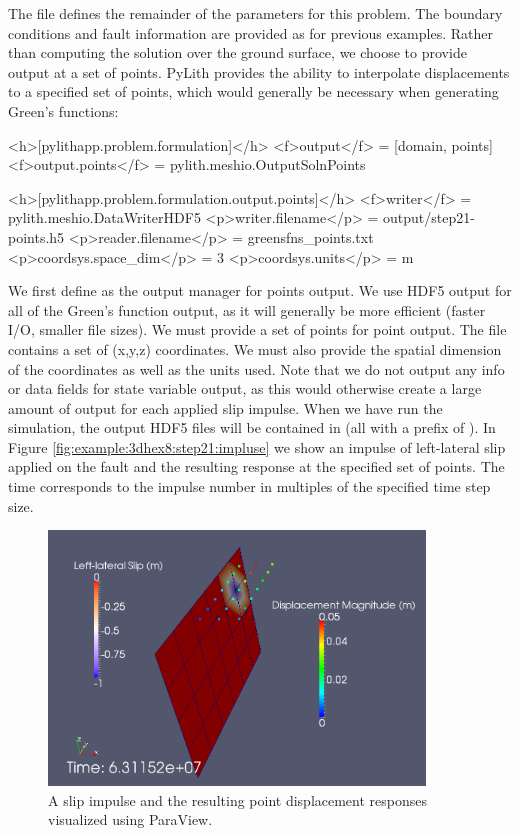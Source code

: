 The  file defines the remainder of the parameters
for this problem. The boundary conditions and fault information are
provided as for previous examples. Rather than computing the solution
over the ground surface, we choose to provide output at a set of points.
PyLith provides the ability to interpolate displacements to a specified
set of points, which would generally be necessary when generating
Green's functions:
\begin{cfg}
<h>[pylithapp.problem.formulation]</h>
<f>output</f> = [domain, points]
<f>output.points</f> = pylith.meshio.OutputSolnPoints

<h>[pylithapp.problem.formulation.output.points]</h>
<f>writer</f> = pylith.meshio.DataWriterHDF5
<p>writer.filename</p> = output/step21-points.h5
<p>reader.filename</p> = greensfns_points.txt
<p>coordsys.space_dim</p> = 3
<p>coordsys.units</p> = m
\end{cfg}
We first define  as the output manager for
points output. We use HDF5 output for all of the Green's function
output, as it will generally be more efficient (faster I/O, smaller
file sizes). We must provide a set of points for point output. The
file  contains a set of (x,y,z) coordinates.
We must also provide the spatial dimension of the coordinates as well
as the units used. Note that we do not output any info or data fields
for state variable output, as this would otherwise create a large
amount of output for each applied slip impulse. When we have run the
simulation, the output HDF5 files will be contained in 
(all with a prefix of ). In Figure \vref{fig:example:3dhex8:step21:impluse}
we show an impulse of left-lateral slip applied on the fault and the
resulting response at the specified set of points. The time corresponds
to the impulse number in multiples of the specified time step size.

\begin{figure}
  \includegraphics[width=10cm]{examples/figs/3dhex8_step21_impulse_resp}
  \caption{A slip impulse and the resulting point displacement
    responses visualized using ParaView. }
  \label{fig:example:3dhex8:step21:impluse}
\end{figure}


